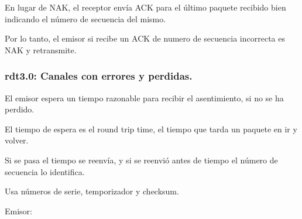 \documentclass[12pt, twoside, openright]{report} %
\begin{document}
En lugar de NAK, el receptor envía ACK para el último paquete
recibido bien indicando el número de secuencia del mismo.

Por lo tanto, el emisor si recibe un ACK de numero de secuencia
incorrecta es NAK y retransmite.

\subsubsection{rdt3.0: Canales con errores y perdidas.}

El emisor espera un tiempo razonable para recibir el asentimiento,
si no se ha perdido.

El tiempo de espera es el round trip time, el tiempo que tarda un
paquete en ir y volver.

Si se pasa el tiempo se reenvía, y si se reenvió antes de tiempo
el número de secuencia lo identifica.

Usa números de serie, temporizador y checksum.

Emisor:
\end{document}
